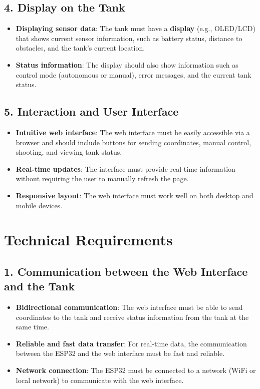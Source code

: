 \documentclass[a4paper,12pt]{article}
\begin{document}
\subsection*{4. Display on the Tank}
\begin{itemize}
    \item \textbf{Displaying sensor data}: The tank must have a \textbf{display} (e.g., OLED/LCD) that shows current sensor information, such as battery status, distance to obstacles, and the tank’s current location.
    \item \textbf{Status information}: The display should also show information such as control mode (autonomous or manual), error messages, and the current tank status.
\end{itemize}

\subsection*{5. Interaction and User Interface}
\begin{itemize}
    \item \textbf{Intuitive web interface}: The web interface must be easily accessible via a browser and should include buttons for sending coordinates, manual control, shooting, and viewing tank status.
    \item \textbf{Real-time updates}: The interface must provide real-time information without requiring the user to manually refresh the page.
    \item \textbf{Responsive layout}: The web interface must work well on both desktop and mobile devices.
\end{itemize}

\section*{Technical Requirements}

\subsection*{1. Communication between the Web Interface and the Tank}
\begin{itemize}
    \item \textbf{Bidirectional communication}: The web interface must be able to send coordinates to the tank and receive status information from the tank at the same time.
    \item \textbf{Reliable and fast data transfer}: For real-time data, the communication between the ESP32 and the web interface must be fast and reliable.
    \item \textbf{Network connection}: The ESP32 must be connected to a network (WiFi or local network) to communicate with the web interface.
\end{itemize}
\end{document}
